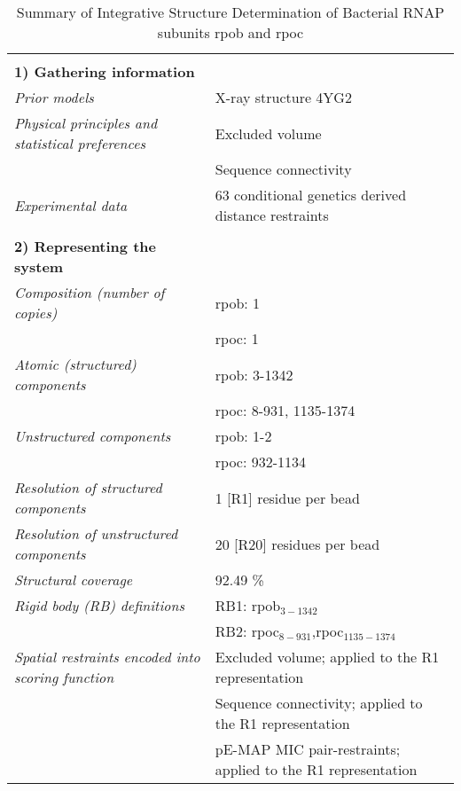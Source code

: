 \documentclass[8pt,a4paper]{article}
\begin{document}
\setcounter{table}{2}

\begin{longtable}{ p{} | p{} } 
\caption{Summary of Integrative Structure Determination of Bacterial RNAP subunits rpob and rpoc}
  
  &  \\
  \textbf{1) Gathering information} & \\
    \hline

            \textit{Prior models} & X-ray structure 4YG2\\
                \textit{Physical principles and statistical preferences} & Excluded volume\\
            & Sequence connectivity \\
                \textit{Experimental data} & 63 conditional genetics derived distance restraints\\
          
    &  \\
    \normalsize{\textbf{2) Representing the system}} & \\
    \hline
    
            \textit{Composition (number of copies)} & rpob: 1\\
            & rpoc: 1 \\
                \textit{Atomic (structured) components} & rpob: 3-1342\\
            & rpoc: 8-931, 1135-1374 \\
                \textit{Unstructured components} & rpob: 1-2\\
            & rpoc: 932-1134 \\
                \textit{Resolution of structured components} & 1 [R1] residue per bead\\
                \textit{Resolution of unstructured components} & 20 [R20] residues per bead\\
                \textit{Structural coverage} & 92.49 \%\\
                \textit{Rigid body (RB) definitions} & RB1: rpob$_{3-1342}$\\
            & RB2: rpoc$_{8-931}$,rpoc$_{1135-1374}$ \\
                \textit{Spatial restraints encoded into scoring function} & Excluded volume; applied to the R1 representation\\
            & Sequence connectivity; applied to the R1 representation \\
            & pE-MAP MIC pair-restraints; applied to the R1 representation \\
          



\end{longtable}
\end{document}
